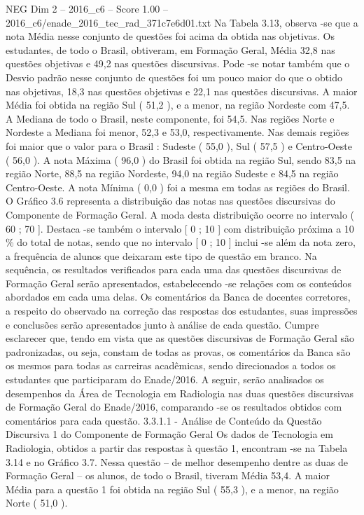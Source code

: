 \begin{textsample}{NEG Dim 2 – 2016\_c6 – Score 1.00 – 2016\_c6/enade\_2016\_tec\_rad\_371c7e6d01.txt}
Na Tabela 3.13, observa -se que a nota Média nesse conjunto de questões foi acima da obtida nas objetivas.
Os estudantes, de todo o Brasil, obtiveram, em Formação Geral, Média 32,8 nas questões objetivas e 49,2 nas questões discursivas.
Pode -se notar também que o Desvio padrão nesse conjunto de questões foi um pouco maior do que o obtido nas objetivas, 18,3 nas questões objetivas e 22,1 nas questões discursivas.
A maior Média foi obtida na região Sul ( 51,2 ), e a menor, na região Nordeste com 47,5.
A Mediana de todo o Brasil, neste componente, foi 54,5.
Nas regiões Norte e Nordeste a Mediana foi menor, 52,3 e 53,0, respectivamente.
Nas demais regiões foi maior que o valor para o Brasil : Sudeste ( 55,0 ), Sul ( 57,5 ) e Centro-Oeste ( 56,0 ).
A nota Máxima ( 96,0 ) do Brasil foi obtida na região Sul, sendo 83,5 na região Norte, 88,5 na região Nordeste, 94,0 na região Sudeste e 84,5 na região Centro-Oeste.
A nota Mínima ( 0,0 ) foi a mesma em todas as regiões do Brasil.
O Gráfico 3.6 representa a distribuição das notas nas questões discursivas do Componente de Formação Geral.
A moda desta distribuição ocorre no intervalo ( 60 ; 70 ].
Destaca -se também o intervalo [ 0 ; 10 ] com distribuição próxima a 10 \% do total de notas, sendo que no intervalo [ 0 ; 10 ] inclui -se além da nota zero, a frequência de alunos que deixaram este tipo de questão em branco.
Na sequência, os resultados verificados para cada uma das questões discursivas de Formação Geral serão apresentados, estabelecendo -se relações com os conteúdos abordados em cada uma delas.
Os comentários da Banca de docentes corretores, a respeito do observado na correção das respostas dos estudantes, suas impressões e conclusões serão apresentados junto à análise de cada questão.
Cumpre esclarecer que, tendo em vista que as questões discursivas de Formação Geral são padronizadas, ou seja, constam de todas as provas, os comentários da Banca são os mesmos para todas as carreiras acadêmicas, sendo direcionados a todos os estudantes que participaram do Enade/2016.
A seguir, serão analisados os desempenhos da Área de Tecnologia em Radiologia nas duas questões discursivas de Formação Geral do Enade/2016, comparando -se os resultados obtidos com comentários para cada questão. 3.3.1.1 - Análise de Conteúdo da Questão Discursiva 1 do Componente de Formação Geral Os dados de Tecnologia em Radiologia, obtidos a partir das respostas à questão 1, encontram -se na Tabela 3.14 e no Gráfico 3.7.
Nessa questão – de melhor desempenho dentre as duas de Formação Geral – os alunos, de todo o Brasil, tiveram Média 53,4.
A maior Média para a questão 1 foi obtida na região Sul ( 55,3 ), e a menor, na região Norte ( 51,0 ).

\end{textsample}
